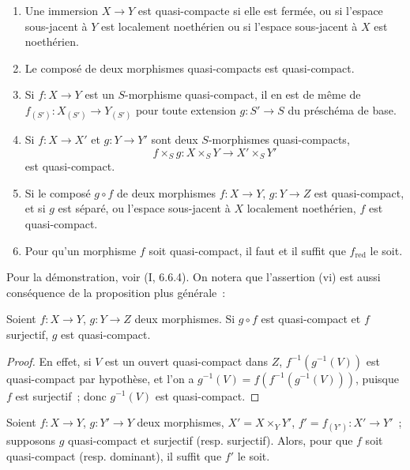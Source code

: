 \begin{proposition}[1.1.2]
\label{IV.1.1.2-fr}
\begin{enumerate}
  \item[(i)] Une immersion $X\to Y$ est quasi-compacte si elle est fermée, ou si
  l'espace sous-jacent à $Y$ est localement noethérien ou si l'espace
  sous-jacent à $X$ est noethérien.
  \item[(ii)] Le composé de deux morphismes quasi-compacts est quasi-compact.
  \item[(iii)] Si $f:X\to Y$ est un $S$-morphisme quasi-compact, il en est de même de
  $f_{(S')}:X_{(S')}\to Y_{(S')}$ pour toute extension $g:S'\to S$ du
  préschéma de base.
  \item[(iv)] Si $f:X\to X'$ et $g:Y\to Y'$ sont deux $S$-morphismes
  quasi-compacts,
  \[
    f\times_S g:X\times_S Y\to X'\times_S Y'
  \]
  est quasi-compact.
  \item[(v)] Si le composé $g\circ f$ de deux morphismes $f:X\to Y$, $g:Y\to Z$
  est quasi-compact, et si $g$ est séparé, ou l'espace sous-jacent à $X$
  localement noethérien, $f$ est quasi-compact.
  \item[(vi)] Pour qu'un morphisme $f$ soit quasi-compact, il faut et il suffit que
  $f_{\mathrm{red}}$ le soit.
\end{enumerate}
\end{proposition}

Pour la démonstration, voir (I, 6.6.4). On notera que l'assertion (vi) est
aussi conséquence de la proposition plus générale~:

\begin{proposition}[1.1.3]
\label{IV.1.1.3-fr}
Soient $f:X\to Y$, $g:Y\to Z$ deux morphismes. Si $g\circ f$ est
quasi-compact et $f$ surjectif, $g$ est quasi-compact.
\end{proposition}

\begin{proof}
En effet, si $V$ est un ouvert quasi-compact dans $Z$,
$f^{-1}(g^{-1}(V))$ est quasi-compact par hypothèse, et l'on a
$g^{-1}(V)=f(f^{-1}(g^{-1}(V)))$, puisque $f$ est surjectif~; donc
$g^{-1}(V)$ est quasi-compact.
\end{proof}

\begin{corollary}[1.1.4]
\label{IV.1.1.4-fr}
Soient $f:X\to Y$, $g:Y'\to Y$ deux morphismes, $X'=X\times_Y Y'$,
$f'=f_{(Y')}:X'\to Y'$~; supposons $g$ quasi-compact et surjectif (resp.
surjectif). Alors, pour que $f$ soit quasi-compact (resp. dominant), il suffit
que $f'$ le soit.
\end{corollary}

